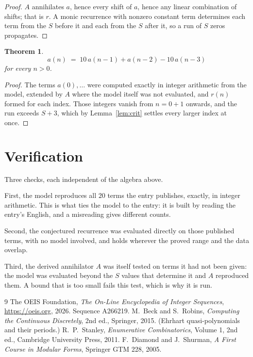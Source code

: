 \documentclass[11pt,a4paper]{article}
\theoremstyle{plain}
\newtheorem{theorem}{Theorem}
\theoremstyle{definition}
\begin{document}
\begin{proof}
$A$ annihilates $a$, hence every shift of $a$, hence any linear combination of shifts; that is
$r$. A monic recurrence with nonzero constant term determines each term from the $S$ before it
and each from the $S$ after it, so a run of $S$ zeros propagates.
\end{proof}

\begin{theorem}
\[
a(n)\;=\;10\,a(n-1) + a(n-2) - 10\,a(n-3)
\]
for every $n>0$.
\end{theorem}

\begin{proof}
The terms $a(0),\dots$ were computed exactly in integer arithmetic from the model, extended by
$A$ where the model itself was not evaluated, and $r(n)$ formed for each index. Those integers
vanish from $n=0+1$ onwards, and the run exceeds $S+3$, which by
Lemma~\ref{lem:crit} settles every larger index at once.
\end{proof}

\section{Verification}

Three checks, each independent of the algebra above.

First, the model reproduces all $20$ terms the entry publishes, exactly, in integer
arithmetic. This is what ties the model to the entry: it is built by reading the entry's
English, and a misreading gives different counts.

Second, the conjectured recurrence was evaluated directly on those published terms, with no
model involved, and holds wherever the proved range and the data overlap.

Third, the derived annihilator $A$ was itself tested on terms it had not been given: the model
was evaluated beyond the $S$ values that determine it and $A$ reproduced them. A bound that is
too small fails this test, which is why it is run.

\begin{thebibliography}{9}
 The OEIS Foundation, \emph{The On-Line Encyclopedia of Integer
Sequences}, \url{https://oeis.org}, 2026. Sequence A266219.
 M.~Beck and S.~Robins, \emph{Computing the Continuous Discretely},
2nd ed., Springer, 2015. (Ehrhart quasi-polynomials and their periods.)
 R.~P.~Stanley, \emph{Enumerative Combinatorics}, Volume 1, 2nd ed.,
Cambridge University Press, 2011.
 F.~Diamond and J.~Shurman, \emph{A First Course in Modular Forms},
Springer GTM 228, 2005.
\end{thebibliography}
\end{document}
